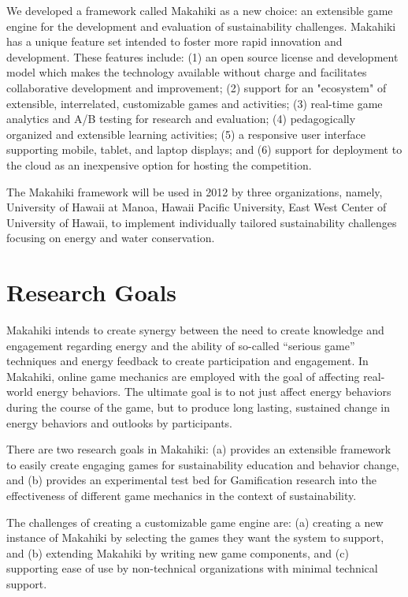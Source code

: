 \documentclass[11pt]{article}
\begin{document}
We developed a framework called Makahiki as a new choice: an extensible game engine for the development and evaluation of sustainability challenges. Makahiki has a unique feature set intended to foster more rapid innovation and development. These features include: (1) an open source license and development model which makes the technology available without charge and facilitates collaborative development and improvement; (2) support for an "ecosystem" of extensible, interrelated, customizable games and activities; (3) real-time game analytics and A/B testing for research and evaluation; (4) pedagogically organized and extensible learning activities; (5) a responsive user interface supporting mobile, tablet, and laptop displays; and (6) support for deployment to the cloud as an inexpensive option for hosting the competition.

The Makahiki framework will be used in 2012 by three organizations, namely, University of Hawaii at Manoa, Hawaii Pacific University, East West Center of University of Hawaii, to implement individually tailored sustainability challenges focusing on energy and water conservation. 

\section{Research Goals}

Makahiki intends to create synergy between the need to create knowledge and engagement regarding energy and the ability of so-called ``serious game'' techniques and energy feedback to create participation and engagement. In Makahiki, online game mechanics are employed with the goal of affecting real-world energy behaviors.  The ultimate goal is to not just affect energy behaviors during the course of the game, but to produce long lasting, sustained change in energy behaviors and outlooks by participants.

There are two research goals in Makahiki: (a) provides an extensible framework to easily create engaging games for sustainability education and behavior change, and (b) provides an experimental test bed for Gamification research into the effectiveness of different game mechanics in the context of sustainability.

The challenges of creating a customizable game engine are:  (a) creating a new instance of Makahiki by selecting the games they want the system to support, and (b) extending Makahiki by writing new game components, and (c) supporting ease of use by non-technical organizations with minimal technical support.
\end{document}
